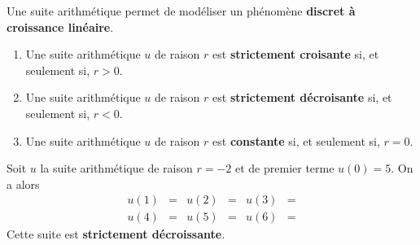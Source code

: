 \documentclass[11pt]{article}
\begin{document}
\begin{rmq}
  Une suite arithmétique permet de modéliser un phénomène \textbf{discret à
  croissance linéaire}.
\end{rmq}

\begin{prop}
  \begin{enumerate}
    \item Une suite arithmétique $u$ de raison $r$ est \textbf{strictement
      croisante} si, et seulement si, $r>0$.
    \item Une suite arithmétique $u$ de raison $r$ est \textbf{strictement
      d\'ecroisante} si, et seulement si, $r<0$.
    \item Une suite arithmétique $u$ de raison $r$ est \textbf{constante} si, et
      seulement si, $r=0$.
  \end{enumerate}
\end{prop}

\begin{exemple}
  Soit $u$ la suite arithmétique de raison $r=-2$ et de premier terme $u(0)=5$. On
  a alors
  \begin{align*}
    u(1) &= &
    u(2) &= &
    u(3) &= \\
    u(4) &= &
    u(5) &= &
    u(6) &=
  \end{align*}
  Cette suite est \textbf{strictement décroissante}.
\end{exemple}
\end{document}
